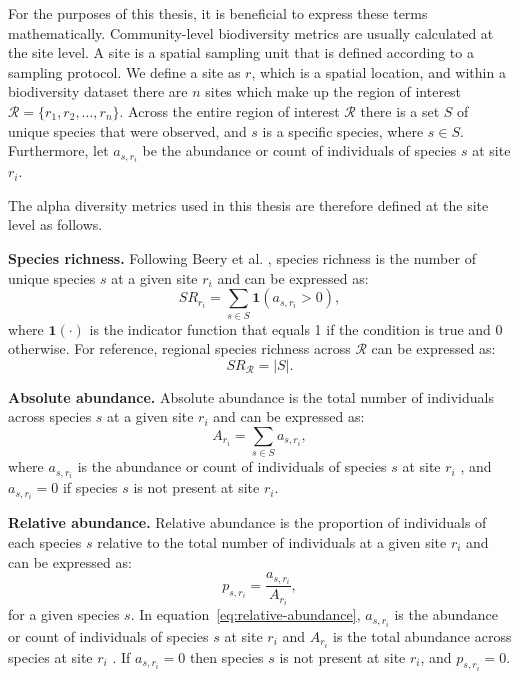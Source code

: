 For the purposes of this thesis, it is beneficial to express these terms mathematically. Community-level biodiversity metrics are usually calculated at the site level. A site is a spatial sampling unit that is defined according to a sampling protocol. We define a site as \(r\), which is a spatial location, and within a biodiversity dataset there are \(n\) sites which make up the region of interest \(\mathcal{R} = \{r_1, r_2, \ldots , r_n\}\). Across the entire region of interest \(\mathcal{R}\) there is a set \(S\) of unique species that were observed, and \(s\) is a specific species, where \(s \in S\). Furthermore, let \(a_{s,r_i}\) be the abundance or count of individuals of species \(s\) at site \(r_i\).

The alpha diversity metrics used in this thesis are therefore defined at the site level as follows.

\noindent\textbf{Species richness.} Following Beery et al. \parencite{beery2021}, species richness is the number of unique species \(s\) at a given site \(r_i\) and can be expressed as:
\begin{equation}
SR_{r_i} = \sum_{s \in S} \mathbf{1}(a_{s,r_i} > 0),
\label{eq:species-richness-site}
\end{equation}
where \(\mathbf{1}(\cdot)\) is the indicator function that equals 1 if the condition is true and 0 otherwise.
For reference, regional species richness across \(\mathcal{R}\) can be expressed as:
\begin{equation}
SR_{\mathcal{R}} = \left|S\right|.
\label{eq:species-richness-regional}
\end{equation}

\noindent\textbf{Absolute abundance.} Absolute abundance is the total number of individuals across species \(s\) at a given site \(r_i\) and can be expressed as:
\begin{equation}
A_{r_i} = \sum_{s \in S} a_{s,r_i},
\label{eq:absolute-abundance}
\end{equation}
where \(a_{s,r_i}\) is the abundance or count of individuals of species \(s\) at site \(r_i\) \parencite{beery2021}, and \(a_{s,r_i} = 0\) if species \(s\) is not present at site \(r_i\).

\noindent\textbf{Relative abundance.} Relative abundance is the proportion of individuals of each species \(s\) relative to the total number of individuals at a given site \(r_i\) and can be expressed as:
\begin{equation}
p_{s,r_i} = \frac{a_{s,r_i}}{A_{r_i}},
\label{eq:relative-abundance}
\end{equation}
for a given species \(s\). In equation~\eqref{eq:relative-abundance}, \(a_{s,r_i}\) is the abundance or count of individuals of species \(s\) at site \(r_i\) and \(A_{r_i}\) is the total abundance across species at site \(r_i\) \parencite{beery2021}. If \(a_{s,r_i} = 0\) then species \(s\) is not present at site \(r_i\), and \(p_{s,r_i} = 0\).

